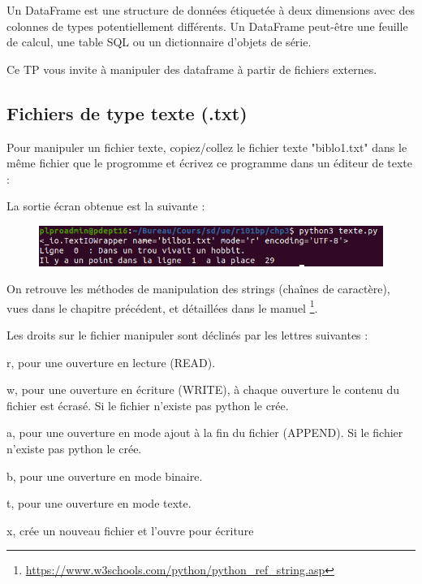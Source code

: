 
Un DataFrame est une structure de données étiquetée à deux dimensions avec des colonnes de types potentiellement différents. Un DataFrame peut-être une feuille de calcul, une table SQL ou un dictionnaire d'objets de série.

Ce TP vous invite à manipuler des dataframe à partir de fichiers externes.

\subsection{Fichiers de type texte (.txt)}




Pour manipuler un fichier texte, copiez/collez le fichier texte "biblo1.txt" dans le même fichier que le progromme et écrivez ce programme dans un éditeur de texte :



La sortie écran obtenue est la suivante : 

\begin{figure}[H]
    \centering
    \includegraphics[scale = 0.5]{chapitre3/figures/texte.png}
\end{figure}

On retrouve les méthodes de manipulation des strings (chaînes de caractère), vues dans le chapitre précédent, et détaillées dans le manuel
\footnote{\url{https://www.w3schools.com/python/python_ref_string.asp}}.

\begin{tcolorbox}[lefttitle=2cm, colframe=gray!75!blue, title= \textbf{Tip for Code 1 : "\textit{les Droits}"}]

Les droits sur le fichier manipuler sont déclinés par les lettres suivantes :

r, pour une ouverture en lecture (READ).

w, pour une ouverture en écriture (WRITE), à chaque ouverture le contenu du fichier est écrasé. Si le fichier n'existe pas python le crée.

a, pour une ouverture en mode ajout à la fin du fichier (APPEND). Si le fichier n'existe pas python le crée.

b, pour une ouverture en mode binaire.

t, pour une ouverture en mode texte.

x, crée un nouveau fichier et l'ouvre pour écriture


\end{tcolorbox}


